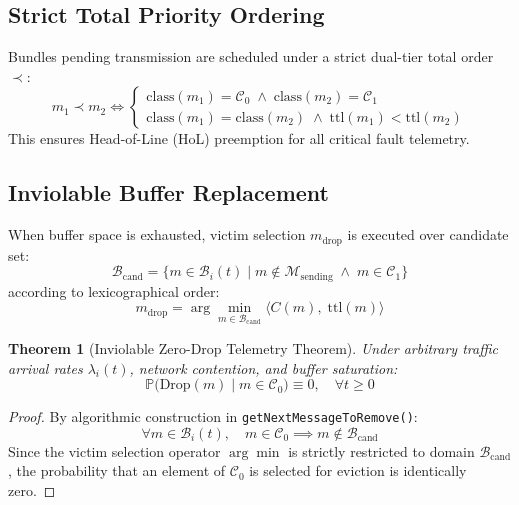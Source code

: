 \documentclass[journal,compsoc]{IEEEtran}
\newtheorem{theorem}{Theorem}
\begin{document}
\subsection{Strict Total Priority Ordering}
Bundles pending transmission are scheduled under a strict dual-tier total order $\prec$:
\begin{equation}
m_1 \prec m_2 \iff \begin{cases}
\mathrm{class}(m_1) = \mathcal{C}_0 \;\land\; \mathrm{class}(m_2) = \mathcal{C}_1 \\[3pt]
\mathrm{class}(m_1) = \mathrm{class}(m_2) \;\land\; \mathrm{ttl}(m_1) < \mathrm{ttl}(m_2)
\end{cases}
\end{equation}
This ensures Head-of-Line (HoL) preemption for all critical fault telemetry.

\subsection{Inviolable Buffer Replacement}
When buffer space is exhausted, victim selection $m_{\mathrm{drop}}$ is executed over candidate set:
\begin{equation}
\mathcal{B}_{\mathrm{cand}} = \bigl\{ m \in \mathcal{B}_i(t) \;\big|\; m \notin \mathcal{M}_{\mathrm{sending}} \;\land\; m \in \mathcal{C}_1 \bigr\}
\end{equation}
according to lexicographical order:
\begin{equation}
m_{\mathrm{drop}} = \arg\min_{m \in \mathcal{B}_{\mathrm{cand}}} \bigl\langle C(m), \; \mathrm{ttl}(m) \bigr\rangle
\end{equation}

\begin{theorem}[Inviolable Zero-Drop Telemetry Theorem]
\label{thm:zero_drop}
Under arbitrary traffic arrival rates $\lambda_i(t)$, network contention, and buffer saturation:
\begin{equation}
\mathbb{P}\bigl(\mathrm{Drop}(m) \;\big|\; m \in \mathcal{C}_0\bigr) \equiv 0, \quad \forall t \ge 0
\end{equation}
\end{theorem}

\begin{proof}
By algorithmic construction in \texttt{getNextMessageToRemove()}:
\begin{equation*}
\forall m \in \mathcal{B}_i(t), \quad m \in \mathcal{C}_0 \implies m \notin \mathcal{B}_{\mathrm{cand}}
\end{equation*}
Since the victim selection operator $\arg\min$ is strictly restricted to domain $\mathcal{B}_{\mathrm{cand}}$, the probability that an element of $\mathcal{C}_0$ is selected for eviction is identically zero.
\end{proof}
\end{document}
